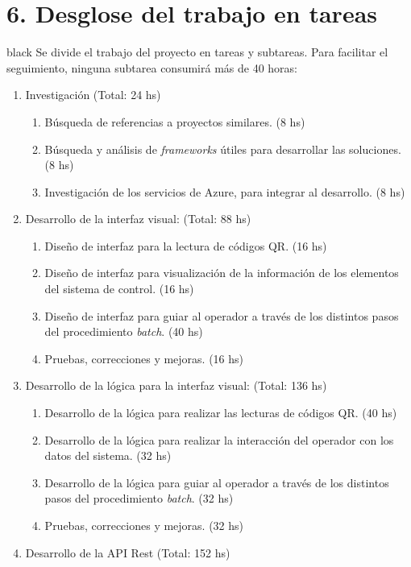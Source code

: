 \documentclass[11pt]{charter}
\begin{document}
\section{6. Desglose del trabajo en tareas}
\label{sec:wbs}

\begin{consigna}{black}
Se divide el trabajo del proyecto en tareas y subtareas. Para facilitar el seguimiento, ninguna subtarea
consumirá más de 40 horas:

\begin{enumerate}
\item Investigación (Total: 24 hs)
	\begin{enumerate}
	\item Búsqueda de referencias a proyectos similares. (8 hs)
	\item Búsqueda y análisis de \textit{frameworks} útiles para desarrollar las soluciones.  (8 hs)
	\item Investigación de los servicios de Azure, para integrar al desarrollo. (8 hs)
	\end{enumerate}
\item Desarrollo de la interfaz visual: (Total: 88 hs)
	\begin{enumerate}
	\item Diseño de interfaz para la lectura de códigos QR. (16 hs)
	\item Diseño de interfaz para visualización de la información de los elementos del sistema de control. (16 hs)
	\item Diseño de interfaz para guiar al operador a través de los distintos pasos del procedimiento \textit{batch}. (40 hs)
	\item Pruebas, correcciones y mejoras. (16 hs)
	\end{enumerate}
\item Desarrollo de la lógica para la interfaz visual: (Total: 136 hs)
	\begin{enumerate}
	\item Desarrollo de la lógica para realizar las lecturas de códigos QR. (40 hs)
	\item Desarrollo de la lógica para realizar la interacción del operador con los datos del sistema. (32 hs)
	\item Desarrollo de la lógica para guiar al operador a través de los distintos pasos del procedimiento \textit{batch}. (32 hs)
	\item Pruebas, correcciones y mejoras. (32 hs)
	\end{enumerate}
\item Desarrollo de la API Rest (Total: 152 hs)

\end{enumerate}
\end{consigna}
\end{document}

